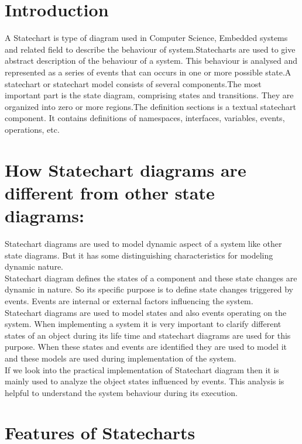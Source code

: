 \documentclass{article}
\begin{document}
\section{Introduction}
A Statechart is type of diagram used in Computer Science, Embedded systems and related field to describe the behaviour of system.Statecharts are used to give abstract description of the behaviour of a system. This behaviour is analysed and represented as a series of events that can occurs in one or more possible state.A statechart or statechart model consists of several components.The most important part is the state diagram, comprising states and transitions. They are organized into zero or more regions.The definition sections is a textual statechart component. It contains definitions of namespaces, interfaces, variables, events, operations, etc.
\newpage
\section{How Statechart diagrams are different from other state diagrams:}
Statechart diagrams are used to model dynamic aspect of a system like other state diagrams. But it has some distinguishing characteristics for modeling dynamic nature.\\
Statechart diagram defines the states of a component and these state changes are dynamic in nature. So its specific purpose is to define state changes triggered by events. Events are internal or external factors influencing the system.\\
Statechart diagrams are used to model states and also events operating on the system. When implementing a system it is very important to clarify different states of an object during its life time and statechart diagrams are used for this purpose. When these states and events are identified they are used to model it and these models are used during implementation of the system.\\
If we look into the practical implementation of Statechart diagram then it is mainly used to analyze the object states influenced by events. This analysis is helpful to understand the system behaviour during its execution.\\
\newpage

\section{Features of Statecharts}
\end{document}
